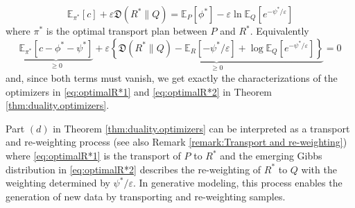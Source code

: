 \documentclass{amsart}
\theoremstyle{definition}
\theoremstyle{remark}
\numberwithin{equation}{section}
\begin{document}
\begin{equation}
 \mathbb{E}_{\pi^*}[c] + \varepsilon \mathfrak{D}(R^*\|Q) = \mathbb{E}_P[\phi^*] -\varepsilon \ln \mathbb{E}_Q[e^{-\psi^*/\varepsilon}]
\end{equation}
where $\pi^*$ is the optimal transport plan between $P$ and $R^*$.  Equivalently 
\begin{equation}\label{eq:proofduality}
\underbrace{ \mathbb{E}_{\pi^*}[c - \phi^* - \psi^*]
 }_{\ge 0}+ \varepsilon 
 \underbrace{\left\{ \mathfrak{D}(R^*\|Q) -  \mathbb{E}_{R}[-\psi^*/\varepsilon] + \log \mathbb{E}_Q[e^{-\psi^*/\varepsilon}] \right\}
 }_{\ge 0} = 0
\end{equation}
and, since both terms must vanish, we get exactly the characterizations
of the optimizers in \eqref{eq:optimalR*1} and \eqref{eq:optimalR*2} in Theorem \ref{thm:duality.optimizers}.  

Part $(d)$ in Theorem \ref{thm:duality.optimizers} can be interpreted as a transport and re-weighting process (see also Remark \ref{remark:Transport and re-weighting}) where  \eqref{eq:optimalR*1} is the transport of $P$ to $R^*$ and the emerging Gibbs distribution in \eqref{eq:optimalR*2} describes the re-weighting of $R^*$ to $Q$ with the weighting determined by $\psi^*/\varepsilon$. In generative modeling, this process enables the generation of new data by transporting and re-weighting samples. 
\end{document}
